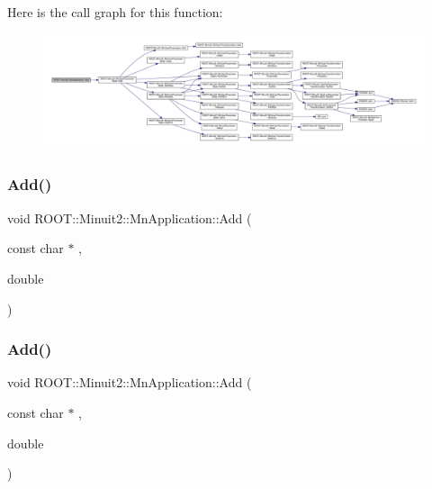Here is the call graph for this function\+:
\nopagebreak
\begin{figure}[H]
\begin{center}
\leavevmode
\includegraphics[width=350pt]{df/dd5/classROOT_1_1Minuit2_1_1MnApplication_a67220ef54f4862a27490162b2f7cf832_cgraph}
\end{center}
\end{figure}
\mbox{\label{classROOT_1_1Minuit2_1_1MnApplication_a67220ef54f4862a27490162b2f7cf832}} 
\subsubsection{\texorpdfstring{Add()}{Add()}\hspace{0.1cm}{\footnotesize\ttfamily [8/9]}}
{\footnotesize\ttfamily void R\+O\+O\+T\+::\+Minuit2\+::\+Mn\+Application\+::\+Add (\begin{DoxyParamCaption}\item[{const char $\ast$}]{,  }\item[{double}]{ }\end{DoxyParamCaption})}

\mbox{\label{classROOT_1_1Minuit2_1_1MnApplication_a67220ef54f4862a27490162b2f7cf832}} 
\subsubsection{\texorpdfstring{Add()}{Add()}\hspace{0.1cm}{\footnotesize\ttfamily [9/9]}}
{\footnotesize\ttfamily void R\+O\+O\+T\+::\+Minuit2\+::\+Mn\+Application\+::\+Add (\begin{DoxyParamCaption}\item[{const char $\ast$}]{,  }\item[{double}]{ }\end{DoxyParamCaption})}

